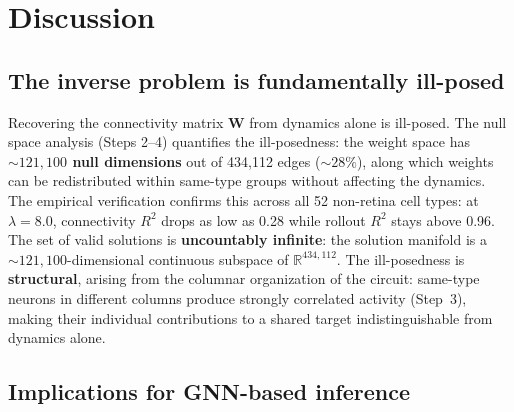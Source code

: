 \documentclass[11pt,a4paper]{article}
\begin{document}
\section{Discussion}

\subsection{The inverse problem is fundamentally ill-posed}

Recovering the connectivity matrix $\mathbf{W}$ from dynamics alone is ill-posed. The null space analysis (Steps 2--4) quantifies the ill-posedness: the weight space has \textbf{${\sim}121{,}100$ null dimensions} out of 434,112 edges (${\sim}28\%$), along which weights can be redistributed within same-type groups without affecting the dynamics. The empirical verification confirms this across all 52 non-retina cell types: at $\lambda = 8.0$, connectivity $R^2$ drops as low as 0.28 while rollout $R^2$ stays above 0.96. The set of valid solutions is \textbf{uncountably infinite}: the solution manifold is a ${\sim}121{,}100$-dimensional continuous subspace of $\mathbb{R}^{434{,}112}$. The ill-posedness is \textbf{structural}, arising from the columnar organization of the circuit: same-type neurons in different columns produce strongly correlated activity (Step~3), making their individual contributions to a shared target indistinguishable from dynamics alone.

\subsection{Implications for GNN-based inference}
\end{document}
